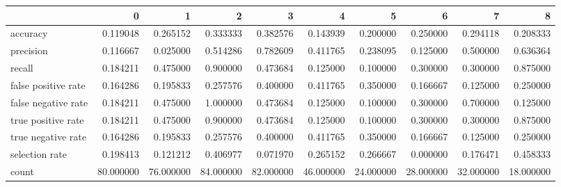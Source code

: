 \begin{tabular}{lrrrrrrrrr}
\toprule
{} &          0 &          1 &          2 &          3 &          4 &          5 &          6 &          7 &          8 \\
\midrule
accuracy            &   0.119048 &   0.265152 &   0.333333 &   0.382576 &   0.143939 &   0.200000 &   0.250000 &   0.294118 &   0.208333 \\
precision           &   0.116667 &   0.025000 &   0.514286 &   0.782609 &   0.411765 &   0.238095 &   0.125000 &   0.500000 &   0.636364 \\
recall              &   0.184211 &   0.475000 &   0.900000 &   0.473684 &   0.125000 &   0.100000 &   0.300000 &   0.300000 &   0.875000 \\
false positive rate &   0.164286 &   0.195833 &   0.257576 &   0.400000 &   0.411765 &   0.350000 &   0.166667 &   0.125000 &   0.250000 \\
false negative rate &   0.184211 &   0.475000 &   1.000000 &   0.473684 &   0.125000 &   0.100000 &   0.300000 &   0.700000 &   0.125000 \\
true positive rate  &   0.184211 &   0.475000 &   0.900000 &   0.473684 &   0.125000 &   0.100000 &   0.300000 &   0.300000 &   0.875000 \\
true negative rate  &   0.164286 &   0.195833 &   0.257576 &   0.400000 &   0.411765 &   0.350000 &   0.166667 &   0.125000 &   0.250000 \\
selection rate      &   0.198413 &   0.121212 &   0.406977 &   0.071970 &   0.265152 &   0.266667 &   0.000000 &   0.176471 &   0.458333 \\
count               &  80.000000 &  76.000000 &  84.000000 &  82.000000 &  46.000000 &  24.000000 &  28.000000 &  32.000000 &  18.000000 \\
\bottomrule
\end{tabular}

